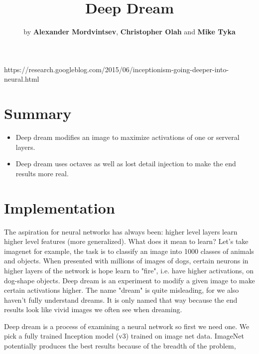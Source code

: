 \documentclass[graybox]{svmult}
\begin{document}
\title*{Deep Dream}
\author{by \textbf{Alexander Mordvintsev}, \textbf{Christopher Olah} and \textbf{Mike Tyka}}


%
%
\maketitle

https://research.googleblog.com/2015/06/inceptionism-going-deeper-into-neural.html


\section{Summary}
\label{sec:1}

\begin{itemize}
  \item Deep dream modifies an image to maximize activations of one or serveral layers.

  \item Deep dream uses octaves as well as lost detail injection to make the end results more real.

\end{itemize}

\section{Implementation}

The aspiration for neural networks has always been: higher level layers learn higher level features (more generalized). What does it mean to learn? Let's take imagenet for example, the task is to classify an image into 1000 classes of animals and objects. When presented with millions of images of dogs, certain neurons in higher layers of the network is hope learn to "fire", i.e. have higher activations, on dog-shape objects. Deep dream is an experiment to modify a given image to make certain activations higher. The name "dream" is quite misleading, for we also haven't fully understand dreams. It is only named that way because the end results look like vivid images we often see when dreaming.

Deep dream is a process of examining a neural network so first we need one. We pick a fully trained Inception model (v3) trained on image net data. ImageNet potentially produces the best results because of the breadth of the problem,
\end{document}
